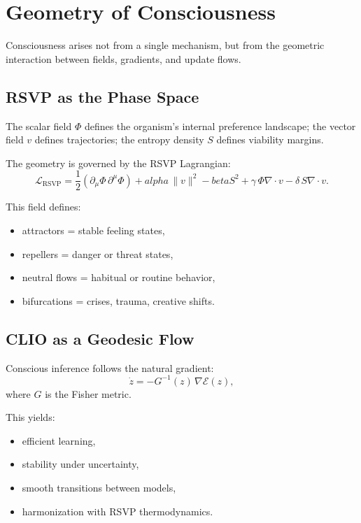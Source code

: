 \documentclass[12pt,oneside]{book}
\theoremstyle{plain}
\theoremstyle{definition}
\def\mathbf#1{#1}%
\def\alpha{alpha}%
\def\beta{beta}%
\begin{document}
\section{Geometry of Consciousness}

Consciousness arises not from a single mechanism, but from the geometric 
interaction between fields, gradients, and update flows.

\subsection{RSVP as the Phase Space}

The scalar field $\Phi$ defines the organism’s internal preference landscape;  
the vector field $\mathbf{v}$ defines trajectories;  
the entropy density $S$ defines viability margins.

The geometry is governed by the RSVP Lagrangian:
\[
\mathcal{L}_{\mathrm{RSVP}}
    = \frac{1}{2}(\partial_\mu\Phi\,\partial^\mu\Phi)
      + \alpha\,\lVert\mathbf{v}\rVert^2
      - \beta S^2
      + \gamma\,\Phi\nabla\cdot\mathbf{v}
      - \delta\,S\nabla\cdot\mathbf{v}.
\]

This field defines:

\begin{itemize}
    \item attractors = stable feeling states,
    \item repellers = danger or threat states,
    \item neutral flows = habitual or routine behavior,
    \item bifurcations = crises, trauma, creative shifts.
\end{itemize}

\subsection{CLIO as a Geodesic Flow}

Conscious inference follows the natural gradient:
\[
\dot{z} = - G^{-1}(z) \,\nabla \mathcal{E}(z),
\]
where $G$ is the Fisher metric.

This yields:

\begin{itemize}
    \item efficient learning,
    \item stability under uncertainty,
    \item smooth transitions between models,
    \item harmonization with RSVP thermodynamics.
\end{itemize}
\end{document}
